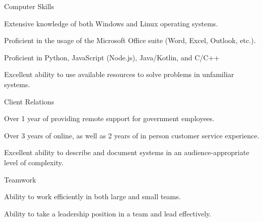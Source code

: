 
\begin{cvskills}

  \cvskill
    {Computer Skills} %
    {
	\begin{cvitems}
	\item {Extensive knowledge of both Windows and Linux operating systems.}
	\item {Proficient in the usage of the Microsoft Office suite (Word, Excel, Outlook, etc.).}
	\item {Proficient in Python, JavaScript (Node.js), Java/Kotlin, and C/C++}
	\item {Excellent ability to use available resources to solve problems in unfamiliar systems.}
	\end{cvitems}
    } %

  \cvskill
    {Client Relations} %
    {
	\begin{cvitems}
	\item {Over 1 year of providing remote support for government employees.}
	\item {Over 3 years of online, as well as 2 years of in person customer service experience.}
	\item {Excellent ability to describe and document systems in an audience-appropriate level of complexity.}
	\end{cvitems}
    } %

  \cvskill
    {Teamwork} %
    {
	\begin{cvitems}
	\item {Ability to work efficiently in both large and small teams.}
	\item {Ability to take a leadership position in a team and lead effectively.}
	\end{cvitems}
    } %

\end{cvskills}
